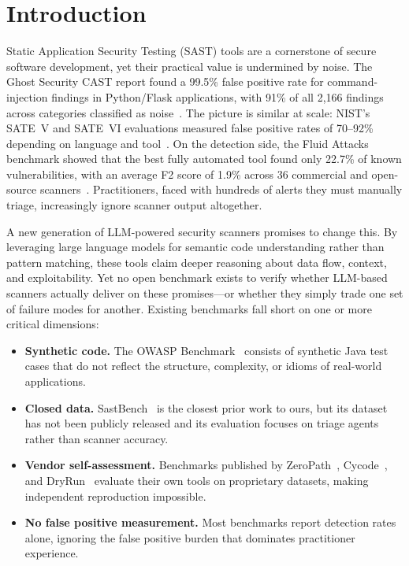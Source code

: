 \section{Introduction}

Static Application Security Testing (SAST) tools are a cornerstone of secure
software development, yet their practical value is undermined by noise.
The Ghost Security CAST report found a 99.5\% false positive rate for
command-injection findings in Python/Flask applications, with 91\% of all
2{,}166 findings across categories classified as noise~\cite{ghost2025cast}.
The picture is similar at scale: NIST's SATE~V and SATE~VI evaluations
measured false positive rates of 70--92\% depending on language and
tool~\cite{delaitre2018satev,delaitre2023satevi}. On the detection side,
the Fluid Attacks benchmark showed that the best fully automated tool found
only 22.7\% of known vulnerabilities, with an average F2 score of 1.9\%
across 36 commercial and open-source scanners~\cite{fluidattacks2025}.
Practitioners, faced with hundreds of alerts they must manually triage,
increasingly ignore scanner output altogether.

A new generation of LLM-powered security scanners promises to change this.
By leveraging large language models for semantic code understanding rather than
pattern matching, these tools claim deeper reasoning about data flow, context,
and exploitability. Yet no open benchmark exists to verify whether LLM-based
scanners actually deliver on these promises---or whether they simply trade one
set of failure modes for another. Existing benchmarks fall short on one or more
critical dimensions:

\begin{itemize}
  \item \textbf{Synthetic code.} The OWASP Benchmark~\cite{owaspbenchmark}
    consists of synthetic Java test cases that do not reflect the structure,
    complexity, or idioms of real-world applications.
  \item \textbf{Closed data.} SastBench~\cite{feiglin2026sastbench} is the
    closest prior work to ours, but its dataset has not been publicly released
    and its evaluation focuses on triage agents rather than scanner accuracy.
  \item \textbf{Vendor self-assessment.} Benchmarks published by
    ZeroPath~\cite{zeropath2024}, Cycode~\cite{cycode2024benchmark}, and
    DryRun~\cite{dryrun2025sast} evaluate their own tools on proprietary
    datasets, making independent reproduction impossible.
  \item \textbf{No false positive measurement.} Most benchmarks report
    detection rates alone, ignoring the false positive burden that dominates
    practitioner experience.
\end{itemize}

